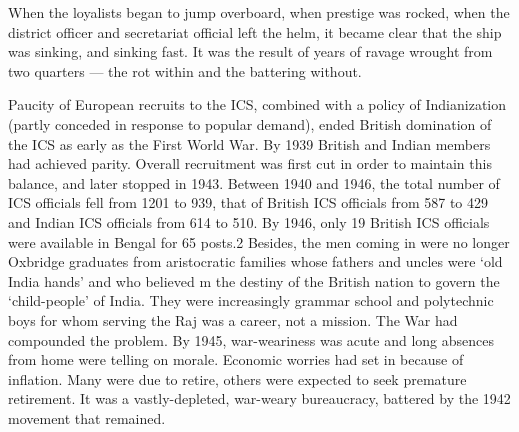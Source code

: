 When the loyalists began to jump overboard, when prestige was rocked, when the district officer and secretariat official left the helm, it became clear that the ship was sinking, and sinking fast. It was the result of years of ravage wrought from two quarters — the rot within and the battering without. 

Paucity of European recruits to the ICS, combined with a policy of Indianization (partly conceded in response to popular demand), ended British domination of the ICS as early as the First World War. By 1939 British and Indian members had achieved parity. Overall recruitment was first cut in order to maintain this balance, and later stopped in 1943. Between 1940 and 1946, the total number of ICS officials fell from 1201 to 939, that of British ICS officials from 587 to 429 and Indian ICS officials from 614 to 510. By 1946, only 19 British ICS officials were available in Bengal for 65 posts.2 Besides, the men coming in were no longer Oxbridge graduates from aristocratic families whose fathers and uncles were `old India hands' and who believed m the destiny of the British nation to govern the `child-people' of India. They were increasingly grammar school and polytechnic boys for whom serving the Raj was a career, not a mission. The War had compounded the problem. By 1945, war-weariness was acute and long absences from home were telling on morale. Economic worries had set in because of inflation. Many were due to retire, others were expected to seek premature retirement. It was a vastly-depleted, war-weary bureaucracy, battered by the 1942 movement that remained. 

